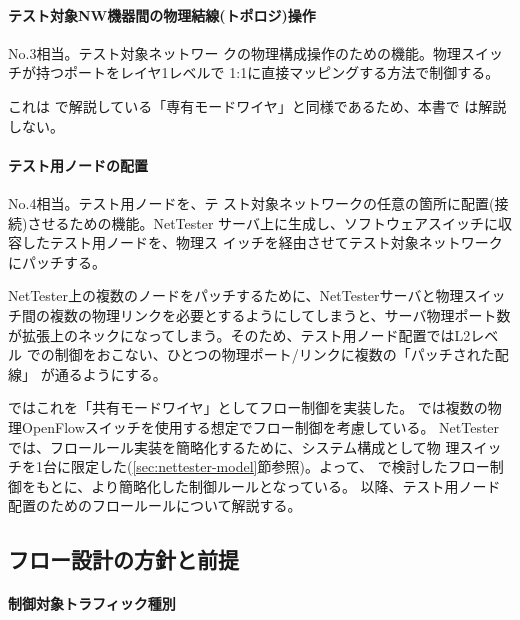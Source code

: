     \paragraph{テスト対象NW機器間の物理結線(トポロジ)操作}

 No.3相当。テスト対象ネットワー
クの物理構成操作のための機能。物理スイッチが持つポートをレイヤ1レベルで
1:1に直接マッピングする方法で制御する。

これは \lopjc で解説している「専有モードワイヤ」と同様であるため、本書で
は解説しない。

    \paragraph{テスト用ノードの配置}

 No.4相当。テスト用ノードを、テ
スト対象ネットワークの任意の箇所に配置(接続)させるための機能。NetTester
サーバ上に生成し、ソフトウェアスイッチに収容したテスト用ノードを、物理ス
イッチを経由させてテスト対象ネットワークにパッチする。

NetTester上の複数のノードをパッチするために、NetTesterサーバと物理スイッ
チ間の複数の物理リンクを必要とするようにしてしまうと、サーバ物理ポート数
が拡張上のネックになってしまう。そのため、テスト用ノード配置ではL2レベル
での制御をおこない、ひとつの物理ポート/リンクに複数の「パッチされた配線」
が通るようにする。

\lopj ではこれを「共有モードワイヤ」としてフロー制御を実装した。\lopj
では複数の物理OpenFlowスイッチを使用する想定でフロー制御を考慮している。
NetTesterでは、フロールール実装を簡略化するために、システム構成として物
理スイッチを1台に限定した(\ref{sec:nettester-model}節参照)。よって、
\lopj で検討したフロー制御をもとに、より簡略化した制御ルールとなっている。
以降、テスト用ノード配置のためのフロールールについて解説する。

  \subsection{フロー設計の方針と前提}
  \label{sec:flow-design-premise}

    \paragraph{制御対象トラフィック種別}

